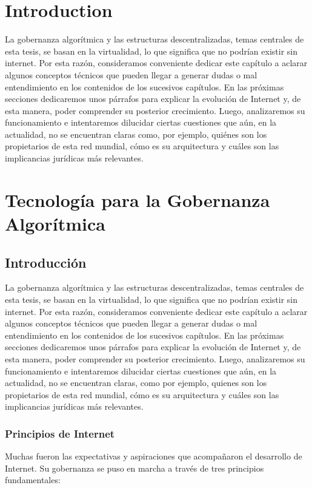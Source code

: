 \documentclass[12pt]{report} %
\begin{document}
\chapter{Introduction}
\label{Introducción}
La gobernanza algorítmica y las estructuras descentralizadas, temas centrales de esta tesis, se basan en la virtualidad, lo que significa que no podrían existir sin internet. Por esta razón, consideramos conveniente dedicar este capítulo a aclarar algunos conceptos técnicos que pueden llegar a generar dudas o mal entendimiento en los contenidos de los sucesivos capítulos. En las próximas secciones dedicaremos unos párrafos para explicar la evolución de Internet y, de esta manera, poder comprender su posterior crecimiento. Luego, analizaremos su funcionamiento e intentaremos dilucidar ciertas cuestiones que aún, en la actualidad, no se encuentran claras como, por ejemplo, quiénes son los propietarios de esta red mundial, cómo es su arquitectura y cuáles son las implicancias jurídicas más relevantes.





\chapter{Tecnología para la Gobernanza Algorítmica}
\label{Tecnología para la Gobernanza Algorítmica}
\section{Introducción}
La gobernanza algorítmica y las estructuras descentralizadas, temas centrales de esta tesis, se basan en la virtualidad, lo que significa que no podrían existir sin internet. Por esta razón, consideramos conveniente dedicar este capítulo a aclarar algunos conceptos técnicos que pueden llegar a generar dudas o mal entendimiento en los contenidos de los sucesivos capítulos. En las próximas secciones dedicaremos unos párrafos para explicar la evolución de Internet y, de esta manera, poder comprender su posterior crecimiento. Luego, analizaremos su funcionamiento e intentaremos dilucidar ciertas cuestiones que aún, en la actualidad, no se encuentran claras, como por ejemplo, quienes son los propietarios de esta red mundial, cómo es su arquitectura y cuáles son las implicancias jurídicas más relevantes.

\subsection{Principios de Internet}
Muchas fueron las expectativas y aspiraciones que acompañaron el desarrollo de Internet. Su gobernanza se puso en marcha a través de tres principios fundamentales:
\end{document}

